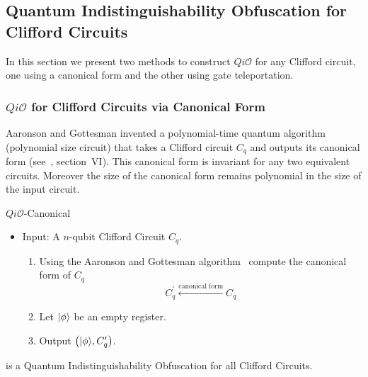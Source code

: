 \subsection{Quantum Indistinguishability Obfuscation for Clifford Circuits}
\label{QiO:Clifford-Circuits}
 In this section we present two methods to construct $Qi\mathcal{O}$ for any Clifford circuit,  one using a canonical form and the other using gate teleportation.

\subsubsection{$Qi\mathcal{O}$ for Clifford Circuits via Canonical Form}
\label{sec:Clifford-iO-canonical}
Aaronson and Gottesman invented a polynomial-time quantum algorithm (polynomial size circuit) that takes a Clifford circuit $C_q$ and outputs its canonical form (see~\cite{AG04}, section~VI). This canonical form is invariant for any two equivalent circuits. Moreover the size of the canonical form remains polynomial in the size of the input circuit.
\begin{algorithm}[]
\label{QiO:Canonical-Clifford}
   \caption{$Qi\mathcal{O}$-Canonical}
  \begin{itemize}
\item Input: A $n$-qubit Clifford Circuit $C_q.$
 \begin{enumerate}
  \item   Using  the Aaronson and Gottesman algorithm~\cite{AG04} compute the canonical form of $C_q$
   		\begin{equation*}
 		 C_q^\prime \xleftarrow{\mbox{canonical form}}C_q
 		 \end{equation*}
  \item Let ${\lvert}\phi\rangle$ be an empty register.
  \item Output $\left({\lvert}\phi\rangle,C_q^\prime \right)$.
  \end{enumerate}
  \end{itemize}
\end{algorithm}



 \begin{lemma}
 is a Quantum Indistinguishability Obfuscation for all Clifford Circuits.
\end{lemma}

